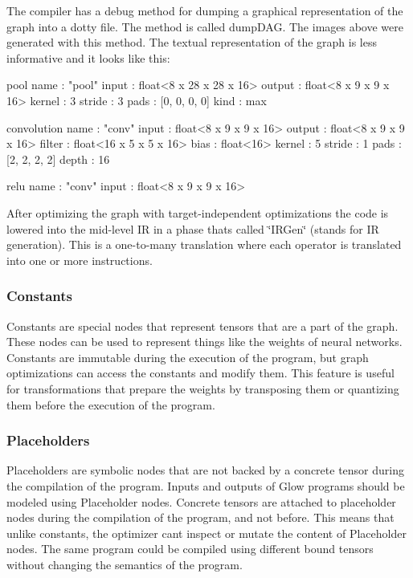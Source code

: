  

The compiler has a debug method for dumping a graphical representation of the graph into a dotty file. The method is called \textquotesingle{}dump\+D\+AG\textquotesingle{}. The images above were generated with this method. The textual representation of the graph is less informative and it looks like this\+:


\begin{DoxyCode}
pool
name : "pool"
input : float<8 x 28 x 28 x 16>
output : float<8 x 9 x 9 x 16>
kernel : 3
stride : 3
pads : [0, 0, 0, 0]
kind : max

convolution
name : "conv"
input : float<8 x 9 x 9 x 16>
output : float<8 x 9 x 9 x 16>
filter : float<16 x 5 x 5 x 16>
bias : float<16>
kernel : 5
stride : 1
pads : [2, 2, 2, 2]
depth : 16

relu
name : "conv"
input : float<8 x 9 x 9 x 16>
\end{DoxyCode}


After optimizing the graph with target-\/independent optimizations the code is lowered into the mid-\/level IR in a phase that\textquotesingle{}s called \char`\"{}\+I\+R\+Gen\char`\"{} (stands for IR generation). This is a one-\/to-\/many translation where each operator is translated into one or more instructions.

\subsubsection*{Constants}

Constants are special nodes that represent tensors that are a part of the graph. These nodes can be used to represent things like the weights of neural networks. Constants are immutable during the execution of the program, but graph optimizations can access the constants and modify them. This feature is useful for transformations that prepare the weights by transposing them or quantizing them before the execution of the program.

\subsubsection*{Placeholders}

Placeholders are symbolic nodes that are not backed by a concrete tensor during the compilation of the program. Inputs and outputs of Glow programs should be modeled using Placeholder nodes. Concrete tensors are attached to placeholder nodes during the compilation of the program, and not before. This means that unlike constants, the optimizer can\textquotesingle{}t inspect or mutate the content of Placeholder nodes. The same program could be compiled using different bound tensors without changing the semantics of the program.

